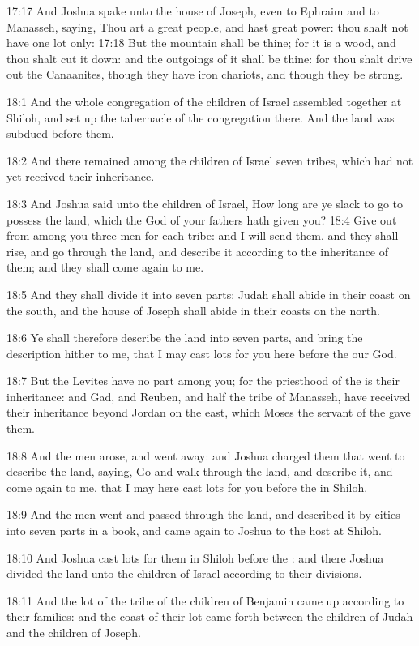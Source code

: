 17:17 And Joshua spake unto the house of Joseph, even to Ephraim and
to Manasseh, saying, Thou art a great people, and hast great power:
thou shalt not have one lot only: 17:18 But the mountain shall be
thine; for it is a wood, and thou shalt cut it down: and the outgoings
of it shall be thine: for thou shalt drive out the Canaanites, though
they have iron chariots, and though they be strong.

18:1 And the whole congregation of the children of Israel assembled
together at Shiloh, and set up the tabernacle of the congregation
there. And the land was subdued before them.

18:2 And there remained among the children of Israel seven tribes,
which had not yet received their inheritance.

18:3 And Joshua said unto the children of Israel, How long are ye
slack to go to possess the land, which the \LORD God of your fathers
hath given you?  18:4 Give out from among you three men for each
tribe: and I will send them, and they shall rise, and go through the
land, and describe it according to the inheritance of them; and they
shall come again to me.

18:5 And they shall divide it into seven parts: Judah shall abide in
their coast on the south, and the house of Joseph shall abide in their
coasts on the north.

18:6 Ye shall therefore describe the land into seven parts, and bring
the description hither to me, that I may cast lots for you here before
the \LORD our God.

18:7 But the Levites have no part among you; for the priesthood of the
\LORD is their inheritance: and Gad, and Reuben, and half the tribe of
Manasseh, have received their inheritance beyond Jordan on the east,
which Moses the servant of the \LORD gave them.

18:8 And the men arose, and went away: and Joshua charged them that
went to describe the land, saying, Go and walk through the land, and
describe it, and come again to me, that I may here cast lots for you
before the \LORD in Shiloh.

18:9 And the men went and passed through the land, and described it by
cities into seven parts in a book, and came again to Joshua to the
host at Shiloh.

18:10 And Joshua cast lots for them in Shiloh before the \LORD: and
there Joshua divided the land unto the children of Israel according to
their divisions.

18:11 And the lot of the tribe of the children of Benjamin came up
according to their families: and the coast of their lot came forth
between the children of Judah and the children of Joseph.

